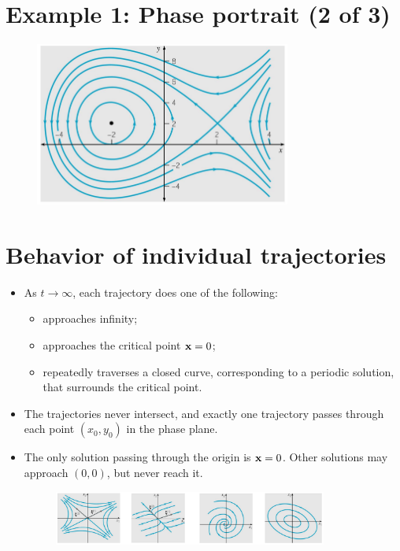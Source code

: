 \documentclass[11pt,a4paper]{article}
\begin{document}
	\section*{Example 1: Phase portrait (2 of 3)}
	\begin{figure}[H]
		\centering
			\includegraphics[width=0.75\textwidth]{figure/Lec16f2.PNG}
	\end{figure}
	\section*{Behavior of individual trajectories}
	\begin{itemize}
		\item As $t \to \infty$, each trajectory does one of the following:
		\begin{itemize}
			\item[\labelitemi] approaches infinity;
			\item[\labelitemi] approaches the critical point $\vb{x} = 0$;
			\item[\labelitemi] repeatedly traverses a closed curve, corresponding to a periodic solution, that surrounds the critical point. 
		\end{itemize}
		\item The trajectories never intersect, and exactly one trajectory passes through each point $(x_0, y_0)$ in the phase plane.
		\item The only solution passing through the origin is $\vb{x} = 0$. Other solutions may approach $(0, 0)$, but never reach it.
		\begin{figure}[H]
			\centering
				\includegraphics[width=0.85\textwidth]{figure/Lec16f3.PNG}
		\end{figure}
	\end{itemize}
\end{document}

